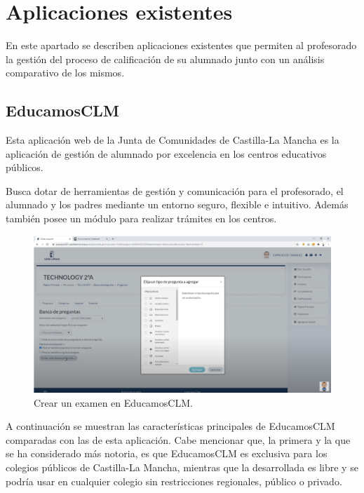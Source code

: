 \chapter{Aplicaciones existentes}
\label{cap:aplicacionesexistentes}

En este apartado se describen aplicaciones existentes que permiten al profesorado la gestión del proceso de calificación de su alumnado junto con un análisis comparativo de los mismos.

\section{EducamosCLM}

Esta aplicación web de la Junta de Comunidades de Castilla-La Mancha\cite{educamosclm} es la aplicación de gestión de alumnado por excelencia en los centros educativos públicos. 

Busca dotar de herramientas de gestión y comunicación para el profesorado, el alumnado y los padres mediante un entorno seguro, flexible e intuitivo. Además también posee un módulo para realizar trámites en los centros.

\begin{figure}[h]
\centering\includegraphics[width=1\linewidth]{figs/educamosCLM2.png}
\caption{Crear un examen en EducamosCLM.\cite{educamosclmyoutube}}
\label{Fig:educamosCLM}
\end{figure}

A continuación se muestran las características principales de EducamosCLM comparadas con las de esta aplicación. Cabe mencionar que, la primera y la que se ha considerado más notoria, es que EducamosCLM es exclusiva para los colegios públicos de Castilla-La Mancha, mientras que la desarrollada es libre y se podría usar en cualquier colegio sin restricciones regionales, público o privado.


